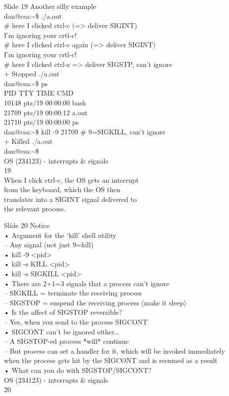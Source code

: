\documentclass{beamer}
\begin{document}
\begin{frame}{Slide 19}
Another silly example\\<0>dan@csa:\textasciitilde{}\$ ./a.out \\\# here I clicked ctrl-c (=> deliver SIGINT)\\I'm ignoring your crtl-c!\\\# here I clicked ctrl-c again (=> deliver SIGINT)\\I'm ignoring your crtl-c!\\\# here I clicked ctrl-z => deliver SIGSTP, can’t ignore\\[1]+  Stopped                 ./a.out\\<148>dan@csa:\textasciitilde{}\$ ps\\  PID TTY          TIME CMD\\10148 pts/19   00:00:00 bash\\21709 pts/19   00:00:12 a.out\\21710 pts/19   00:00:00 ps\\<0>dan@csa:\textasciitilde{}\$ kill -9 21709   \# 9=SIGKILL, can’t ignore\\[1]+  Killed                  ./a.out\\<0>dan@csa:\textasciitilde{}\$\\OS (234123) - interrupts \& signals\\19\\When I click ctrl-c, the OS gets an interrupt \\from the keyboard, which the OS then \\translates into a SIGINT signal delivered to \\the relevant process.
\end{frame}
\begin{frame}{Slide 20}
Notice\\• Argument for the ‘kill’ shell utility \\– Any signal (not just 9=kill)\\• kill -9 <pid>\\• kill -s KILL <pid>\\• kill -s SIGKILL <pid>\\• There are 2+1=3 signals that a process can’t ignore\\– SIGKILL = terminate the receiving process\\– SIGSTOP = suspend the receiving process (make it sleep)\\• Is the affect of SIGSTOP reversible?\\– Yes, when you send to the process SIGCONT\\• SIGCONT can’t be ignored either…\\– A SIGSTOP-ed process *will* continue\\– But process can set a handler for it, which will be invoked immediately  \\when the process gets hit by the SIGCONT and is resumed as a result\\• What can you do with SIGSTOP/SIGCONT?\\OS (234123) - interrupts \& signals\\20
\end{frame}
\end{document}
